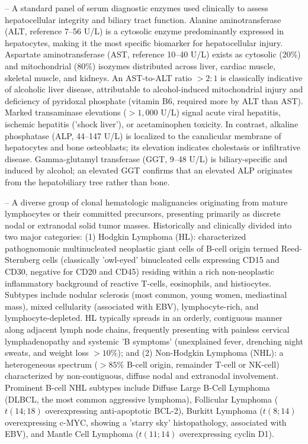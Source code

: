 -- A standard panel of serum diagnostic enzymes used clinically to assess hepatocellular integrity and biliary tract function. Alanine aminotransferase (ALT, reference 7--56 U/L) is a cytosolic enzyme predominantly expressed in hepatocytes, making it the most specific biomarker for hepatocellular injury. Aspartate aminotransferase (AST, reference 10--40 U/L) exists as cytosolic (20\%) and mitochondrial (80\%) isozymes distributed across liver, cardiac muscle, skeletal muscle, and kidneys. An AST-to-ALT ratio $>2:1$ is classically indicative of alcoholic liver disease, attributable to alcohol-induced mitochondrial injury and deficiency of pyridoxal phosphate (vitamin B6, required more by ALT than AST). Marked transaminase elevations ($>1,000$ U/L) signal acute viral hepatitis, ischemic hepatitis ('shock liver'), or acetaminophen toxicity. In contrast, alkaline phosphatase (ALP, 44--147 U/L) is localized to the canalicular membrane of hepatocytes and bone osteoblasts; its elevation indicates cholestasis or infiltrative disease. Gamma-glutamyl transferase (GGT, 9--48 U/L) is biliary-specific and induced by alcohol; an elevated GGT confirms that an elevated ALP originates from the hepatobiliary tree rather than bone.

-- A diverse group of clonal hematologic malignancies originating from mature lymphocytes or their committed precursors, presenting primarily as discrete nodal or extranodal solid tumor masses. Historically and clinically divided into two major categories: (1) Hodgkin Lymphoma (HL): characterized pathognomonic multinucleated neoplastic giant cells of B-cell origin termed Reed-Sternberg cells (classically 'owl-eyed' binucleated cells expressing CD15 and CD30, negative for CD20 and CD45) residing within a rich non-neoplastic inflammatory background of reactive T-cells, eosinophils, and histiocytes. Subtypes include nodular sclerosis (most common, young women, mediastinal mass), mixed cellularity (associated with EBV), lymphocyte-rich, and lymphocyte-depleted. HL typically spreads in an orderly, contiguous manner along adjacent lymph node chains, frequently presenting with painless cervical lymphadenopathy and systemic 'B symptoms' (unexplained fever, drenching night sweats, and weight loss $>10\%$); and (2) Non-Hodgkin Lymphoma (NHL): a heterogeneous spectrum ($>85\%$ B-cell origin, remainder T-cell or NK-cell) characterized by non-contiguous, diffuse nodal and extranodal involvement. Prominent B-cell NHL subtypes include Diffuse Large B-Cell Lymphoma (DLBCL, the most common aggressive lymphoma), Follicular Lymphoma ($t(14;18)$ overexpressing anti-apoptotic BCL-2), Burkitt Lymphoma ($t(8;14)$ overexpressing c-MYC, showing a 'starry sky' histopathology, associated with EBV), and Mantle Cell Lymphoma ($t(11;14)$ overexpressing cyclin D1).


